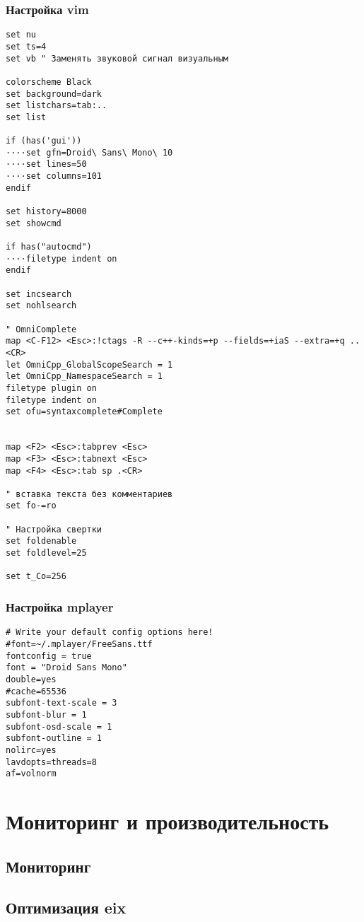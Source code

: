 \documentclass[12pt, a4paper]{article}
\begin{document}
\subsubsection{Настройка vim}
\begin{verbatim}
set nu 
set ts=4
set vb " Заменять звуковой сигнал визуальным

colorscheme Black
set background=dark
set listchars=tab:..
set list

if (has('gui'))
····set gfn=Droid\ Sans\ Mono\ 10 
····set lines=50
····set columns=101
endif

set history=8000
set showcmd

if has("autocmd")
····filetype indent on 
endif

set incsearch
set nohlsearch

" OmniComplete
map <C-F12> <Esc>:!ctags -R --c++-kinds=+p --fields=+iaS --extra=+q ..<CR>
let OmniCpp_GlobalScopeSearch = 1
let OmniCpp_NamespaceSearch = 1
filetype plugin on 
filetype indent on 
set ofu=syntaxcomplete#Complete


map <F2> <Esc>:tabprev <Esc>
map <F3> <Esc>:tabnext <Esc>
map <F4> <Esc>:tab sp .<CR>

" вставка текста без комментариев
set fo-=ro

" Настройка свертки
set foldenable
set foldlevel=25

set t_Co=256
\end{verbatim}


\subsubsection{Настройка mplayer}
\begin{verbatim}
# Write your default config options here!
#font=~/.mplayer/FreeSans.ttf
fontconfig = true
font = "Droid Sans Mono"
double=yes
#cache=65536
subfont-text-scale = 3
subfont-blur = 1
subfont-osd-scale = 1
subfont-outline = 1
nolirc=yes
lavdopts=threads=8
af=volnorm
\end{verbatim}

\newpage
\section{Мониторинг и производительность}

\subsection{Мониторинг}

\subsection{Оптимизация eix}
\end{document}
